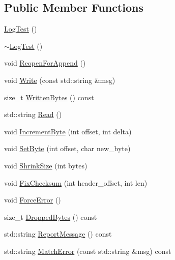 \subsection*{Public Member Functions}
\begin{DoxyCompactItemize}
\item 
\mbox{\hyperlink{classleveldb_1_1log_1_1_log_test_a71c5f0a5a098ca82a72e7065141a1d06}{Log\+Test}} ()
\item 
\mbox{\hyperlink{classleveldb_1_1log_1_1_log_test_adee9ce15bff328c3230fcc097a704400}{$\sim$\+Log\+Test}} ()
\item 
void \mbox{\hyperlink{classleveldb_1_1log_1_1_log_test_a0e83e390485711589ee405d85c9f376f}{Reopen\+For\+Append}} ()
\item 
void \mbox{\hyperlink{classleveldb_1_1log_1_1_log_test_ab8af1c9335e7fbb42e06a6c01de2d0fc}{Write}} (const std\+::string \&msg)
\item 
size\+\_\+t \mbox{\hyperlink{classleveldb_1_1log_1_1_log_test_a602824b02f9220d6813768f6f700db47}{Written\+Bytes}} () const
\item 
std\+::string \mbox{\hyperlink{classleveldb_1_1log_1_1_log_test_a2f5deb8b04200600ac0bc7cd3e39bd57}{Read}} ()
\item 
void \mbox{\hyperlink{classleveldb_1_1log_1_1_log_test_aee52d93f17cf3e23b2ae11bd9a5f5652}{Increment\+Byte}} (int offset, int delta)
\item 
void \mbox{\hyperlink{classleveldb_1_1log_1_1_log_test_a2f3545c3cd495bb60b4322fa045b897c}{Set\+Byte}} (int offset, char new\+\_\+byte)
\item 
void \mbox{\hyperlink{classleveldb_1_1log_1_1_log_test_a2f19ddba7e239badc63920c6fb496823}{Shrink\+Size}} (int bytes)
\item 
void \mbox{\hyperlink{classleveldb_1_1log_1_1_log_test_ac966525faded349590f1a1ae738844cf}{Fix\+Checksum}} (int header\+\_\+offset, int len)
\item 
void \mbox{\hyperlink{classleveldb_1_1log_1_1_log_test_a817eeeba2beef1d81dac83badb9f1049}{Force\+Error}} ()
\item 
size\+\_\+t \mbox{\hyperlink{classleveldb_1_1log_1_1_log_test_a092d7cb6d95b2f101d89dbee74ee15ad}{Dropped\+Bytes}} () const
\item 
std\+::string \mbox{\hyperlink{classleveldb_1_1log_1_1_log_test_a2010f1dfcd23d4cdf295909d0a00ba84}{Report\+Message}} () const
\item 
std\+::string \mbox{\hyperlink{classleveldb_1_1log_1_1_log_test_a51c102136e6f0b4b9567ebad8dff74f1}{Match\+Error}} (const std\+::string \&msg) const

\end{DoxyCompactItemize}
